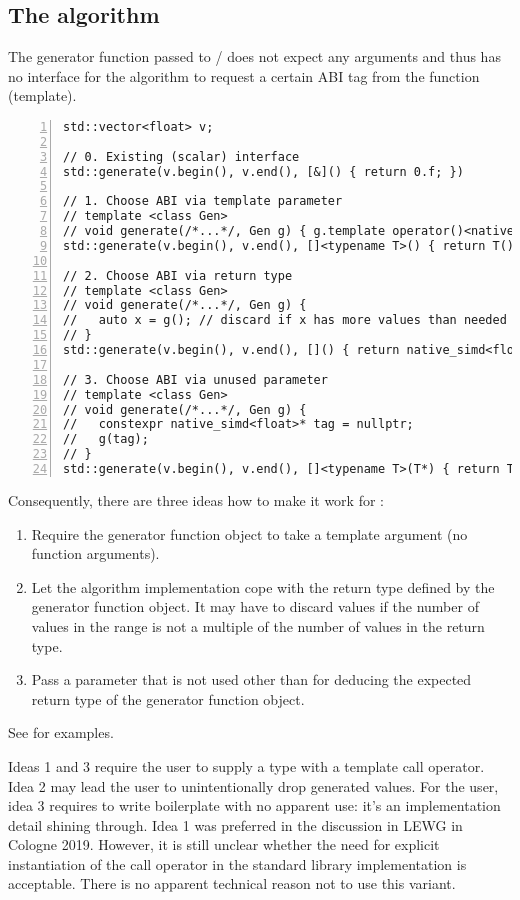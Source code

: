 \subsection{The  algorithm}\label{sec:generate}
The generator function passed to / does not expect any arguments and thus has no interface for the algorithm to request a certain ABI tag from the function (template).
\begin{lstlisting}[style=Vc,numbers=left,float,label=lst:generate example,caption={
Use \code{std::generate} to fill a container with random numbers.
}]
std::vector<float> v;

// 0. Existing (scalar) interface
std::generate(v.begin(), v.end(), [&]() { return 0.f; })

// 1. Choose ABI via template parameter
// template <class Gen>
// void generate(/*...*/, Gen g) { g.template operator()<native_simd<float>>(); }
std::generate(v.begin(), v.end(), []<typename T>() { return T(); });

// 2. Choose ABI via return type
// template <class Gen>
// void generate(/*...*/, Gen g) {
//   auto x = g(); // discard if x has more values than needed
// }
std::generate(v.begin(), v.end(), []() { return native_simd<float>(); });

// 3. Choose ABI via unused parameter
// template <class Gen>
// void generate(/*...*/, Gen g) {
//   constexpr native_simd<float>* tag = nullptr;
//   g(tag);
// }
std::generate(v.begin(), v.end(), []<typename T>(T*) { return T(); });
\end{lstlisting}
Consequently, there are three ideas how to make it work for :
\begin{enumerate}
\item Require the generator function object to take a template argument (no function arguments).
\item Let the algorithm implementation cope with the return type defined by the generator function object.
  It may have to discard values if the number of values in the range is not a multiple of the number of values in the return type.
\item Pass a parameter that is not used other than for deducing the expected return type of the generator function object.
\end{enumerate}
See  for examples.

Ideas 1 and 3 require the user to supply a type with a template call operator.
Idea 2 may lead the user to unintentionally drop generated values.
For the user, idea 3 requires to write boilerplate with no apparent use: it's an implementation detail shining through.
Idea 1 was preferred in the discussion in LEWG in Cologne 2019.
However, it is still unclear whether the need for explicit instantiation of the call operator in the standard library implementation is acceptable.
There is no apparent technical reason not to use this variant.

